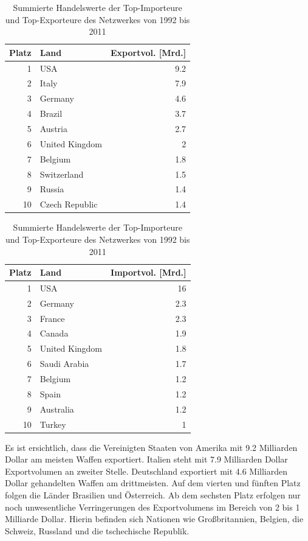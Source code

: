 \documentclass[a4paper,ngerman,oneside,titlepage,bibliography=totoc,11pt]{scrreprt}
\begin{document}
\begin{table}[ht]

\centering

\begin{minipage}[t]{0.48\textwidth}
\footnotesize
\begin{tabular}{rlr}
  \hline
 Platz & Land & Exportvol. [Mrd.]\\ 
  \hline
1 & USA & 9.2\\ 
  2 & Italy & 7.9 \\ 
  3 & Germany & 4.6 \\ 
  4 & Brazil & 3.7 \\ 
  5 & Austria & 2.7 \\ 
  6 & United Kingdom & 2 \\ 
  7 & Belgium & 1.8 \\ 
  8 & Switzerland & 1.5 \\ 
  9 & Russia & 1.4 \\ 
  10 & Czech Republic & 1.4 \\ 
   \hline
	\end{tabular}
	\end{minipage}	
\hfill	
\begin{minipage}[t]{0.48\textwidth}	
\footnotesize
\begin{tabular}{rlr}
  \hline
 Platz & Land & Importvol. [Mrd.]\\ 
  \hline
1 & USA & 16\\ 
  2 & Germany & 2.3\\ 
  3 & France & 2.3\\ 
  4 & Canada & 1.9 \\ 
  5 & United Kingdom & 1.8\\  
  6 & Saudi Arabia & 1.7\\ 
  7 & Belgium & 1.2\\ 
  8 & Spain & 1.2\\ 
  9 & Australia & 1.2\\ 
  10 & Turkey & 1\\ 
   \hline
\end{tabular}
\end{minipage}
\caption{Summierte Handelswerte der Top-Importeure und Top-Exporteure des Netzwerkes von 1992 bis 2011}
\label{tab:tops}
\end{table}


Es ist ersichtlich, dass die Vereinigten Staaten von Amerika mit 9.2 Milliarden Dollar am meisten Waffen exportiert. Italien steht mit 7.9 Milliarden Dollar Exportvolumen an zweiter Stelle. Deutschland exportiert mit 4.6 Milliarden Dollar gehandelten Waffen am drittmeisten. Auf dem vierten und fünften Platz folgen die Länder Brasilien und Österreich. Ab dem sechsten Platz erfolgen nur noch unwesentliche Verringerungen des Exportvolumens im Bereich von 2 bis 1 Milliarde Dollar. Hierin befinden sich Nationen wie Großbritannien, Belgien, die Schweiz, Russland und die tschechische Republik. 
\end{document}

